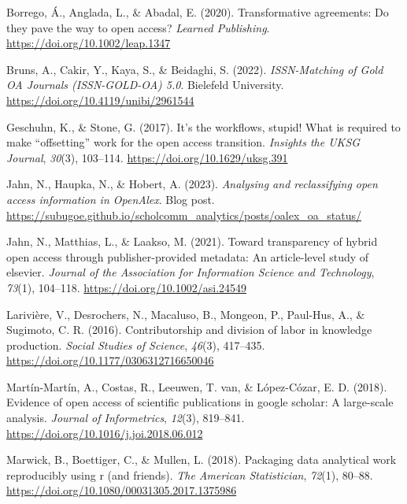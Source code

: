 \documentclass[a4paper,man,floatsintext,longtable,noextraspace,12pt]{apa6}
\newenvironment{CSLReferences}%
  {}%
  {\par}
\begin{document}
\hypertarget{refs}{}
\begin{CSLReferences}{1}{0}
\leavevmode{}%
Borrego, Á., Anglada, L., \& Abadal, E. (2020). Transformative
agreements: Do they pave the way to open access? \emph{Learned
Publishing}. \url{https://doi.org/10.1002/leap.1347}

\leavevmode{}%
Bruns, A., Cakir, Y., Kaya, S., \& Beidaghi, S. (2022).
\emph{{ISSN-Matching of Gold OA Journals (ISSN-GOLD-OA) 5.0}}. Bielefeld
University. \url{https://doi.org/10.4119/unibi/2961544}

\leavevmode{}%
Geschuhn, K., \& Stone, G. (2017). It's the workflows, stupid! What is
required to make {``offsetting''} work for the open access transition.
\emph{Insights the {UKSG} Journal}, \emph{30}(3), 103--114.
\url{https://doi.org/10.1629/uksg.391}

\leavevmode{}%
Jahn, N., Haupka, N., \& Hobert, A. (2023). \emph{Analysing and
reclassifying open access information in OpenAlex}. Blog post.
\url{https://subugoe.github.io/scholcomm_analytics/posts/oalex_oa_status/}

\leavevmode{}%
Jahn, N., Matthias, L., \& Laakso, M. (2021). Toward transparency of
hybrid open access through publisher-provided metadata: An article-level
study of elsevier. \emph{Journal of the Association for Information
Science and Technology}, \emph{73}(1), 104--118.
\url{https://doi.org/10.1002/asi.24549}

\leavevmode{}%
Larivière, V., Desrochers, N., Macaluso, B., Mongeon, P., Paul-Hus, A.,
\& Sugimoto, C. R. (2016). Contributorship and division of labor in
knowledge production. \emph{Social Studies of Science}, \emph{46}(3),
417--435. \url{https://doi.org/10.1177/0306312716650046}

\leavevmode{}%
Martín-Martín, A., Costas, R., Leeuwen, T. van, \& López-Cózar, E. D.
(2018). Evidence of open access of scientific publications in google
scholar: A large-scale analysis. \emph{Journal of Informetrics},
\emph{12}(3), 819--841. \url{https://doi.org/10.1016/j.joi.2018.06.012}

\leavevmode{}%
Marwick, B., Boettiger, C., \& Mullen, L. (2018). Packaging data
analytical work reproducibly using r (and friends). \emph{The American
Statistician}, \emph{72}(1), 80--88.
\url{https://doi.org/10.1080/00031305.2017.1375986}


\end{CSLReferences}
\end{document}
